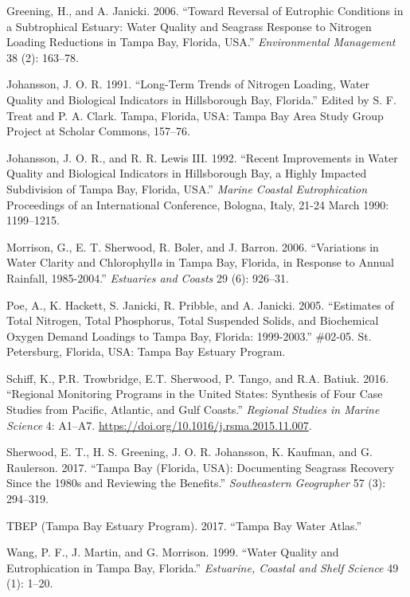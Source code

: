 \documentclass[]{article}
\begin{document}
\hypertarget{ref-Greening06}{}
Greening, H., and A. Janicki. 2006. ``Toward Reversal of Eutrophic
Conditions in a Subtrophical Estuary: Water Quality and Seagrass
Response to Nitrogen Loading Reductions in Tampa Bay, Florida, USA.''
\emph{Environmental Management} 38 (2): 163--78.

\hypertarget{ref-Johansson91}{}
Johansson, J. O. R. 1991. ``Long-Term Trends of Nitrogen Loading, Water
Quality and Biological Indicators in Hillsborough Bay, Florida.'' Edited
by S. F. Treat and P. A. Clark. Tampa, Florida, USA: Tampa Bay Area
Study Group Project at Scholar Commons, 157--76.

\hypertarget{ref-Johansson92}{}
Johansson, J. O. R., and R. R. Lewis III. 1992. ``Recent Improvements in
Water Quality and Biological Indicators in Hillsborough Bay, a Highly
Impacted Subdivision of Tampa Bay, Florida, USA.'' \emph{Marine Coastal
Eutrophication} Proceedings of an International Conference, Bologna,
Italy, 21-24 March 1990: 1199--1215.

\hypertarget{ref-Morrison06}{}
Morrison, G., E. T. Sherwood, R. Boler, and J. Barron. 2006.
``Variations in Water Clarity and Chlorophyll\emph{a} in Tampa Bay,
Florida, in Response to Annual Rainfall, 1985-2004.'' \emph{Estuaries
and Coasts} 29 (6): 926--31.

\hypertarget{ref-Poe05}{}
Poe, A., K. Hackett, S. Janicki, R. Pribble, and A. Janicki. 2005.
``Estimates of Total Nitrogen, Total Phosphorus, Total Suspended Solids,
and Biochemical Oxygen Demand Loadings to Tampa Bay, Florida:
1999-2003.'' \#02-05. St. Petersburg, Florida, USA: Tampa Bay Estuary
Program.

\hypertarget{ref-Schiff16}{}
Schiff, K., P.R. Trowbridge, E.T. Sherwood, P. Tango, and R.A. Batiuk.
2016. ``Regional Monitoring Programs in the United States: Synthesis of
Four Case Studies from Pacific, Atlantic, and Gulf Coasts.''
\emph{Regional Studies in Marine Science} 4: A1--A7.
\url{https://doi.org/10.1016/j.rsma.2015.11.007}.

\hypertarget{ref-Sherwood17}{}
Sherwood, E. T., H. S. Greening, J. O. R. Johansson, K. Kaufman, and G.
Raulerson. 2017. ``Tampa Bay (Florida, USA): Documenting Seagrass
Recovery Since the 1980s and Reviewing the Benefits.''
\emph{Southeastern Geographer} 57 (3): 294--319.

\hypertarget{ref-TBEP17}{}
TBEP (Tampa Bay Estuary Program). 2017. ``Tampa Bay Water Atlas.''

\hypertarget{ref-Wang99}{}
Wang, P. F., J. Martin, and G. Morrison. 1999. ``Water Quality and
Eutrophication in Tampa Bay, Florida.'' \emph{Estuarine, Coastal and
Shelf Science} 49 (1): 1--20.
\end{document}
